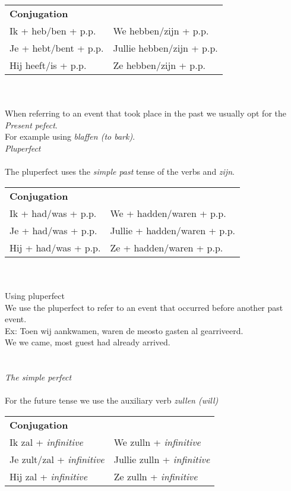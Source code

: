 \documentclass[letterpaper,11pt]{article}
\begin{document}
\begin{tabular}[t]{l l}
    \textbf{Conjugation} \\
    Ik + heb/ben + p.p. &  We hebben/zijn + p.p. \\
    Je + hebt/bent + p.p. & Jullie hebben/zijn + p.p. \\
    Hij heeft/is + p.p. & Ze hebben/zijn + p.p. \\
\end{tabular}
\\ \\
When referring to an event that took place in the past we usually opt for the
\textit{Present pefect}.
\\
For example using \textit{blaffen (to bark)}.
\\
\textit{Pluperfect}
\\ \\
The pluperfect uses the \textit{simple past} tense of the verbs 
and \textit{zijn}.
\\ 
\begin{tabular}[t]{l l}
    \textbf{Conjugation} \\
    Ik + had/was + p.p. & We + hadden/waren + p.p. \\
    Je + had/was + p.p. & Jullie + hadden/waren + p.p. \\
    Hij + had/was + p.p. & Ze + hadden/waren + p.p. \\
\end{tabular}
\\ \\
Using pluperfect \\
We use the pluperfect to refer to an event that occurred before another past
event. \\
Ex: Toen wij aankwamen, waren de meosto gasten al gearriveerd. \\
We we came, most guest had already arrived. \\
\\ \\
\textit{The simple perfect} \\ \\
For the future tense we use the auxiliary verb \textit{zullen (will)} \\
\begin{tabular}[t]{l l}
    \textbf{Conjugation} \\
    Ik zal + \textit{infinitive} & We zulln + \textit{infinitive} \\
    Je zult/zal + \textit{infinitive} & Jullie zulln + \textit{infinitive} \\
    Hij zal + \textit{infinitive} & Ze zulln + \textit{infinitive} \\
\end{tabular} 
\end{document}
